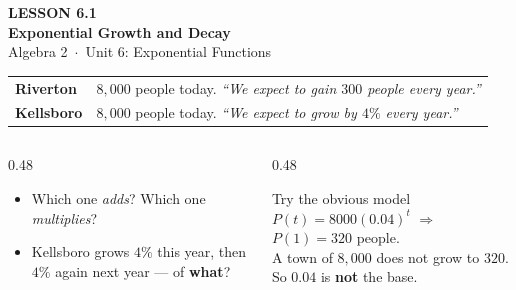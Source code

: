 \documentclass[aspectratio=169, 11pt]{beamer}
\begin{document}
{
\begin{frame}[plain]
  \vspace{2.8cm}\hspace{0.55cm}%
  \begin{minipage}{0.9\textwidth}
    {\color{goldacc}\bfseries\small LESSON 6.1}\\[0.5cm]
    {\color{white}\bfseries\LARGE Exponential Growth and Decay}\\[1.2cm]
    {\color{forestmid}\small Algebra 2~$\cdot$~Unit 6: Exponential Functions}
  \end{minipage}
\end{frame}
}

\begin{frame}[t, plain]
  \begin{center}
  \renewcommand{\arraystretch}{1.5}
  \begin{tabular}{ll}
  \hline
  \textbf{Riverton} & $8{,}000$ people today. \emph{``We expect to gain $300$ people every year.''} \\
  \textbf{Kellsboro} & $8{,}000$ people today. \emph{``We expect to grow by $4\%$ every year.''} \\
  \hline
  \end{tabular}
  \end{center}
  \vspace{6pt}
  \begin{columns}[T]
    \begin{column}{0.48\textwidth}
      \begin{itemize}\setlength{\itemsep}{4pt}
        \item Which one \emph{adds}? Which one \emph{multiplies}?
        \item Kellsboro grows $4\%$ this year, then $4\%$ again next year --- of \textbf{what}?
      \end{itemize}
    \end{column}
    \begin{column}{0.48\textwidth}
      \begin{block}{Try the obvious model}
        $P(t)=8000(0.04)^{t}$ \quad$\Rightarrow$\quad $P(1)=320$ people. \\[3pt]
        A town of $8{,}000$ does not grow to $320$. So $0.04$ is \textbf{not} the base.
      \end{block}
    \end{column}
  \end{columns}
\end{frame}
\end{document}
